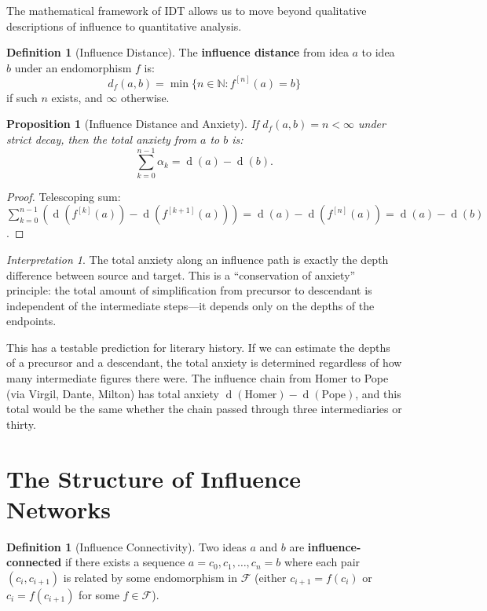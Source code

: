 \documentclass[11pt,openany]{book}
\theoremstyle{definition}
\newtheorem{definition}[axiom]{Definition}
\theoremstyle{plain}
\newtheorem{proposition}[axiom]{Proposition}
\theoremstyle{remark}
\newtheorem{interpretation}[axiom]{Interpretation}
\newcommand{\depth}{\operatorname{d}}       %
\begin{document}
The mathematical framework of IDT allows us to move beyond qualitative descriptions of influence to quantitative analysis.

\begin{definition}[Influence Distance]
The \textbf{influence distance} from idea $a$ to idea $b$ under an endomorphism $f$ is:
\[
d_f(a, b) = \min \{n \in \mathbb{N} : f^{[n]}(a) = b\}
\]
if such $n$ exists, and $\infty$ otherwise.
\end{definition}

\begin{proposition}[Influence Distance and Anxiety]
If $d_f(a, b) = n < \infty$ under strict decay, then the total anxiety from $a$ to $b$ is:
\[
\sum_{k=0}^{n-1} \alpha_k = \depth(a) - \depth(b).
\]
\end{proposition}

\begin{proof}
Telescoping sum: $\sum_{k=0}^{n-1} (\depth(f^{[k]}(a)) - \depth(f^{[k+1]}(a))) = \depth(a) - \depth(f^{[n]}(a)) = \depth(a) - \depth(b)$.
\end{proof}

\begin{interpretation}
The total anxiety along an influence path is exactly the depth difference between source and target. This is a ``conservation of anxiety'' principle: the total amount of simplification from precursor to descendant is independent of the intermediate steps---it depends only on the depths of the endpoints.

This has a testable prediction for literary history. If we can estimate the depths of a precursor and a descendant, the total anxiety is determined regardless of how many intermediate figures there were. The influence chain from Homer to Pope (via Virgil, Dante, Milton) has total anxiety $\depth(\text{Homer}) - \depth(\text{Pope})$, and this total would be the same whether the chain passed through three intermediaries or thirty.
\end{interpretation}

\section{The Structure of Influence Networks}

\begin{definition}[Influence Connectivity]
Two ideas $a$ and $b$ are \textbf{influence-connected} if there exists a sequence $a = c_0, c_1, \ldots, c_n = b$ where each pair $(c_i, c_{i+1})$ is related by some endomorphism in $\mathcal{F}$ (either $c_{i+1} = f(c_i)$ or $c_i = f(c_{i+1})$ for some $f \in \mathcal{F}$).
\end{definition}
\end{document}
